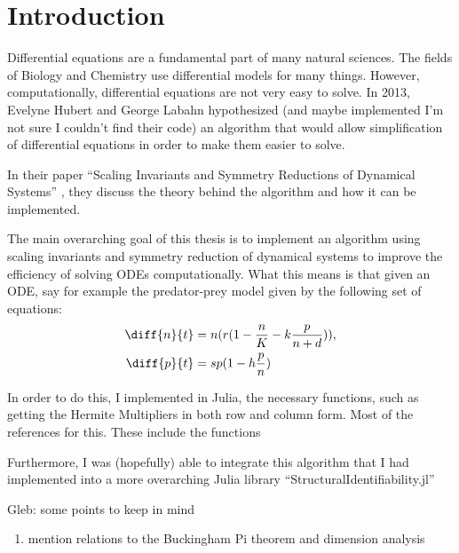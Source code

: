 \documentclass[oneside, a4paper, onecolumn, 11pt]{article}
\begin{document}
\newpage
\tableofcontents
\newpage


\section{Introduction}

Differential equations are a fundamental part of many natural sciences. The fields of Biology and Chemistry use differential models for many things. However, computationally, differential equations are not very easy to solve. In 2013, Evelyne Hubert and George Labahn hypothesized (and maybe implemented I'm not sure I couldn't find their code) an algorithm that would allow simplification of differential equations in order to make them easier to solve.

In their paper ``Scaling Invariants and Symmetry Reductions of Dynamical Systems'' \cite{Hubert2013}, they discuss the theory behind the algorithm and how it can be implemented.

The main overarching goal of this thesis is to implement an algorithm using scaling invariants and symmetry reduction of dynamical systems to improve the efficiency of solving ODEs computationally. What this means is that given an ODE, say for example the predator-prey model given by the following set of equations:
\begin{align*}
    \diff{n}{t}
     & = n (r (1 - \frac{n}{K} - k \frac{p}{n + d})), \\
    \diff{p}{t}
     & = sp (1 - h \frac{p}{n})
\end{align*}

In order to do this, I implemented in Julia, the necessary functions, such as getting the Hermite Multipliers in both row and column form. Most of the references for this. These include the functions \cite{Hubert2013}

Furthermore, I was (hopefully) able to integrate this algorithm that I had implemented into a more overarching Julia library ``StructuralIdentifiability.jl''

{\color{purple}Gleb: some points to keep in mind
\begin{enumerate}
    \item mention relations to the Buckingham Pi theorem and dimension analysis
\end{enumerate}

}

\end{document}
